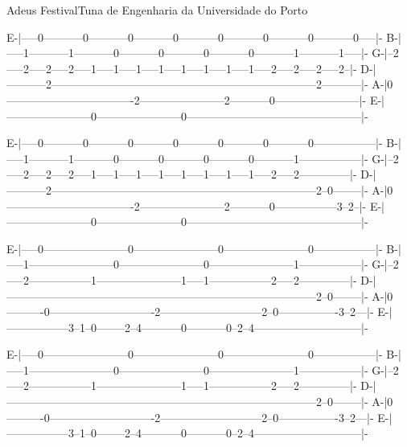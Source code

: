 \begin{musica}{Adeus Festival}{Tuna de Engenharia da Universidade do Porto}{}
\begin{tablatura}
E-|-----0-----------0-----------0-----------0-----------0-----------0-----------0-----------0-----|-
B-|-----1-----------1-----------0-----------0-----------0-----------0-----------1-----------1-----|-
G-|--2-----2-----2-----2-----1-----1-----1-----1-----1-----1-----1-----1-----2-----2-----2-----2--|-
D-|-----------2-----------------------------------------------------------------------2-----------|-
A-|0----------------------------------2-----------------------2-----------0-----------------------|-
E-|-----------------------0-----------------------0-----------------------------------------------|-

E-|-----0-----------0-----------0-----------0-----------0-----------0-----------0-----------------|-
B-|-----1-----------1-----------0-----------0-----------0-----------0-----------1-----------------|-
G-|--2-----2-----2-----2-----1-----1-----1-----1-----1-----1-----1-----1-----2-----2--------------|-
D-|-----------2-----------------------------------------------------------------------2--0--------|-
A-|0----------------------------------2-----------------------2-----------0-----------------3--2--|-
E-|-----------------------0-----------------------0-----------------------------------------------|-

E-|-----0-----------------------0-----------------------0-----------------------0-----------------|-
B-|-----1-----------------------0-----------------------0-----------------------1-----------------|-
G-|--2-----2-----------------1-----------------------1-----1-----------------2-----2--------------|-
D-|-----------------------------------------------------------------------------------2--0--------|-
A-|0----------0----------------------------2---------------------------2--0----------------3--2---|-
E-|-----------------3--1--0--------2--4-----------0-----------0--2--4-----------------------------|-

E-|-----0-----------------------0-----------------------0-----------------------0-----------------|-
B-|-----1-----------------------0-----------------------0-----------------------1-----------------|-
G-|--2-----2-----------------1-----------------------1-----1-----------------2-----2--------------|-
D-|-----------------------------------------------------------------------------------2--0--------|-
A-|0----------0----------------------------2---------------------------2--0----------------3--2---|-
E-|-----------------3--1--0--------2--4-----------0-----------0--2--4-----------------------------|-


\end{tablatura}
\end{musica}
